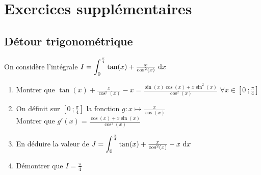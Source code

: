 \documentclass[oneside,12pt]{book}          %
\begin{document}
\section{Exercices supplémentaires}

\subsection{Détour trigonométrique}
On considère l'intégrale $I={\displaystyle\int_{0}^{\frac{\pi}{4}}}\tan(x)+\frac{x}{\cos^2(x)}{\,\,\mathrm{d}} x$
\begin{enumerate} \setlength{\itemsep}{0pt}
    \item Montrer que $\tan(x)+\frac{x}{\cos^2(x)}-x = \frac{\sin(x)\cos(x)+x\sin^2(x)}{\cos^2(x)}$ \quad $\forall x\in\left[0~;\frac{\pi}{4}\right]$
    \item On définit sur $\left[0~;\frac{\pi}{4}\right]$ la fonction $g:x\mapsto\frac{x}{\cos(x)}$\\
    Montrer que $g'(x)=\frac{\cos(x)+x\sin(x)}{\cos^2(x)}$
    \item En déduire la valeur de $J={\displaystyle\int_{0}^{\frac{\pi}{4}}}\tan(x)+\frac{x}{\cos^2(x)}-x{\,\,\mathrm{d}} x$
    \item Démontrer que $I=\frac{\pi}{4}$
\end{enumerate}
\end{document}
